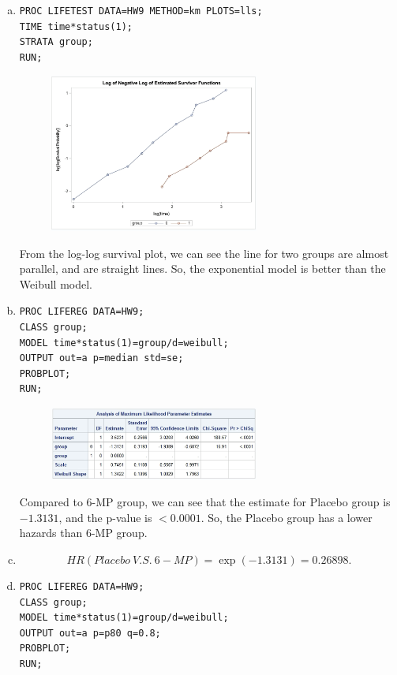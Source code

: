 \documentclass{elegantbook}
\begin{document}
\begin{solution}
    \begin{enumerate}[(a)]
        \item \begin{verbatim}
PROC LIFETEST DATA=HW9 METHOD=km PLOTS=lls;
TIME time*status(1);
STRATA group;
RUN;
        \end{verbatim}
        \begin{figure}[H]
            \centering
            \includegraphics[width=0.65\textwidth]{HW9_3a.png}
        \end{figure}
        From the log-log survival plot, we can see the line for two groups are almost parallel, and are straight lines. So, the exponential model is better than the Weibull model.
    \item \begin{verbatim}
PROC LIFEREG DATA=HW9;
CLASS group;
MODEL time*status(1)=group/d=weibull;
OUTPUT out=a p=median std=se;
PROBPLOT;
RUN;
        \end{verbatim}
        \begin{figure}[H]
            \centering
            \includegraphics[width=0.65\textwidth]{HW9_3b.png}
        \end{figure}
        Compared to 6-MP group, we can see that the estimate for Placebo group is $-1.3131$, and the p-value is $<0.0001$. So, the Placebo group has a lower hazards than 6-MP group. 
        \item \[HR(Placebo\ V.S.\ 6-MP)=\exp(-1.3131)=0.26898. \]
        \item \begin{verbatim}
PROC LIFEREG DATA=HW9;
CLASS group;
MODEL time*status(1)=group/d=weibull;
OUTPUT out=a p=p80 q=0.8;
PROBPLOT;
RUN;


\end{verbatim}
\end{enumerate}
\end{solution}
\end{document}
